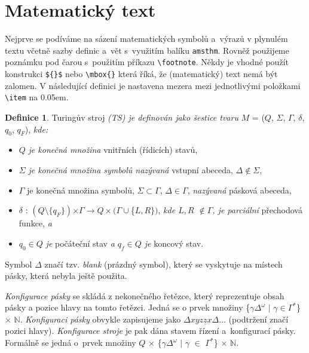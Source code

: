\documentclass[twocolumn, a4paper, 11pt]{article}
\theoremstyle{definition}
\newtheorem{definition}{Definice}
\begin{document}
\section{Matematický text}
Nejprve se podíváme na sázení matematických symbolů a~výrazů v plynulém textu včetně sazby definic a~vět s~využitím balíku \verb|amsthm|. Rovněž použijeme poznámku pod čarou s~použitím příkazu \verb|\footnote|. Někdy je vhodné použít konstrukci \verb|${}$| nebo \verb|\mbox{}| která říká, že (matematický) text nemá být zalomen. V následující definici je nastavena mezera mezi jednotlivými položkami \verb|\item| na 0.05em.\par
\begin{definition}
Turingův stroj \emph{(TS) je definován jako šestice
tvaru} $M$ = ($Q$, $\Sigma$, $\Gamma$, $\delta$, $q_0$, $q_F$), \emph{kde:}
\begin{itemize} \itemsep0.05em
    \item{$Q$ \emph{je konečná množina} vnitřních (řídicích) stavů,}
    \item{$\Sigma$ \emph{je konečná množina symbolů nazývaná} vstupní abeceda, $\Delta \notin \Sigma$,}
    \item{$\Gamma$ je konečná množina symbolů, $\Sigma \subset \Gamma$, $\Delta \in \Gamma$, \emph{nazývaná} pásková abeceda,}
    \item{$\delta$ : $(Q\setminus\{q_F\})$$\times\Gamma \to Q\times$$(\Gamma\cup$\{$L,R\})$, \emph{kde $L,R$ $\notin \Gamma$, je parciální} přechodová funkce, \emph{a}}
    \item{$q_0 \in Q$ \emph{je} počáteční stav \emph{a $q_f \in Q$ je} koncový stav.}
\end{itemize}
\end{definition}
\par Symbol $\Delta$ značí tzv. \emph{blank} (prázdný symbol), který se
vyskytuje na místech pásky, která nebyla ještě použita.\par
\emph{Konfigurace pásky} se skládá z nekonečného řetězce,
který reprezentuje obsah pásky a pozice hlavy na tomto
řetězci. Jedná se o prvek množiny \{$\gamma\Delta^\omega$ $|$ $\gamma \in \Gamma^\ast$\} $\times$ $\mathbb{N}$\footnotemark. \emph{Konfiguraci pásky} obvykle zapisujeme jako $\Delta xyz\underline{z}x\Delta$...
(podtržení značí pozici hlavy). \emph{Konfigurace stroje} je pak dána stavem řízení a~konfigurací pásky. Formálně se jedná o~prvek množiny $Q$ $\times$ \{$\gamma\Delta^\omega$ $|$ $\gamma$ $\in$ $\Gamma^\ast$\} $\times$ $\mathbb{N}$.
\end{document}
